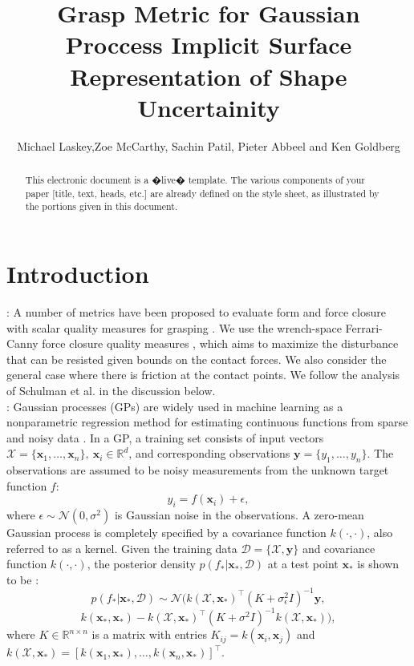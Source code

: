 \documentclass[letterpaper, 10 pt, conference]{ieeeconf}  %
\title{\LARGE \bf
Grasp Metric for Gaussian Proccess Implicit Surface Representation of Shape Uncertainity }
\author{Michael Laskey,Zoe McCarthy, Sachin Patil, Pieter Abbeel and Ken Goldberg}%
\newcommand{\by}{\mathbf{y}}
\newcommand{\bx}{\mathbf{x}}
\newcommand{\mX}{\mathcal{X}}
\newcommand{\mD}{\mathcal{D}}
\newcommand{\mN}{\mathcal{N}}
\begin{document}
\maketitle
\thispagestyle{empty}
\pagestyle{empty}


\begin{abstract}

This electronic document is a �live� template. The various components of your paper [title, text, heads, etc.] are already defined on the style sheet, as illustrated by the portions given in this document.

\end{abstract}


\section{Introduction}

\vspace{10pt}
: A number of metrics have been proposed to evaluate form and force closure with scalar quality measures for grasping \cite{bicchi2000}.
We use the wrench-space Ferrari-Canny force closure quality measures \cite{ferrari1992}, which aims to maximize the disturbance that can be resisted given bounds on the contact forces.
We also consider the general case where there is friction at the contact points.
We follow the analysis of Schulman et al. \cite{schulman2011} in the discussion below.\\


: Gaussian processes (GPs) are widely used in machine learning as a nonparametric regression method for estimating continuous functions from sparse and noisy data \cite{rasmussen2006}.
In a GP, a training set consists of input vectors $\mX = \{\bx_1, \ldots, \bx_n\}, ~\bx_i \in \mathbb{R}^d$, and corresponding observations $\by = \{y_1, \ldots, y_n\}$.
The observations are assumed to be noisy measurements from the unknown target function $f$:
\begin{equation}
y_i = f(\bx_i) + \epsilon,
\end{equation}
where $\epsilon \sim \mN(0,\sigma^2)$ is Gaussian noise in the observations.
A zero-mean Gaussian process is completely specified by a covariance function $k(\cdot,\cdot)$, also referred to as a kernel.
Given the training data $\mD = \{\mX, \by\}$ and covariance function $k(\cdot,\cdot)$, the posterior density $p(f_*|\bx_*,\mD)$ at a test point $\bx_{*}$ is shown to be \cite{rasmussen2006}:
\begin{equation}
  p(f_*|\bx_*,\mD) 
  \sim 
  \mN\big(k(\mX,\bx_*)^{\intercal}(K + \sigma_{\epsilon}^2I)^{-1}\by,
\end{equation}
\[
  k(\bx_*,\bx_*)-k(\mX,\bx_*)^{\intercal}(K+\sigma^2I)^{-1}k(\mX,\bx_*)\big), \label{eq:GPposterior}
\]
where $K \in \mathbb{R}^{n \times n}$ is a matrix with entries $K_{ij} = k(\bx_i,\bx_j)$ and $k(\mX,\bx_*) = [k(\bx_1,\bx_*),\ldots,k(\bx_n,\bx_*)]^{\intercal}$. 
\end{document}
